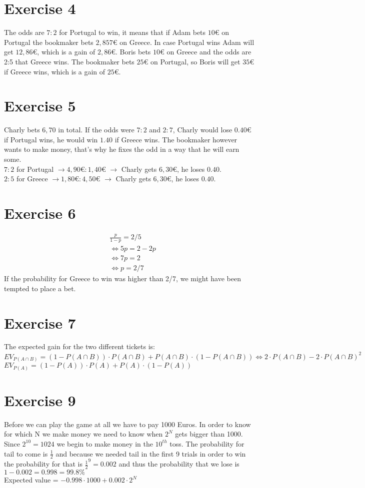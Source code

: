 \section*{Exercise 4}
The odds are $7 : 2$ for Portugal to win, it means that if Adam bets $10\euro$ on Portugal the bookmaker bets $2,857€$ on Greece. In case Portugal wins Adam will get $12,86€$, which is a gain of $2,86€$.
Boris bets $10€$ on Greece and the odds are 2:5 that Greece wins. The bookmaker bets $25€$ on Portugal, so Boris will get $35€$ if Greece wins, which is a gain of $25€$.

\section*{Exercise 5}
Charly bets $6,70$ in total.
If the odds were $7 : 2$ and $2 : 7$, Charly would lose $0.40€$ if Portugal wins, he would win $1.40$ if Greece wins. The bookmaker however wants to make money, that's why he fixes the odd in a way that he will earn some.\\
$7 : 2$ for Portugal $\rightarrow 4,90€ : 1,40€$ $\rightarrow$ Charly gets $6,30€$, he loses $0.40$.\\
$2 : 5$ for Greece $\rightarrow 1,80€ : 4,50€$ $\rightarrow$ Charly gets $6,30€$, he loses $0.40$.

\section*{Exercise 6}
\begin{align*}
& \frac{p}{1-p} = 2/5\\
& \Leftrightarrow 5p = 2 - 2p\\
& \Leftrightarrow 7p = 2\\
& \Leftrightarrow p = 2/7
\end{align*}
If the probability for Greece to win was higher than 2/7, we might have been tempted to place a bet.

\section*{Exercise 7}
The expected gain for the two different tickets is:\\
$EV_{P(A \cap B)} = (1 - P(A \cap B)) \cdot P(A \cap B) + P(A \cap B) \cdot (1 - P(A \cap B)) \Leftrightarrow 2 \cdot P(A \cap B) - 2 \cdot P(A \cap B)^2$ \\
$EV_{P(A)} = (1 - P(A)) \cdot P(A) + P(A) \cdot (1 - P(A))$

\section*{Exercise 9}
Before we can play the game at all we have to pay 1000 Euros. In order to know for which N we make money we need to know when $2^{N}$ gets bigger than 1000. Since $2^{10} = 1024$ we begin to make money in the $10^{th}$ toss.
The probability for tail to come is $\frac{1}{2}$ and because we needed tail in the first 9 trials in order to win the probability for that is $\frac{1}{2}^{9} = 0.002$ and thus the probability that we lose is $1-0.002 = 0.998 = 99.8\%$ \\
Expected value = $-0.998\cdot 1000 + 0.002\cdot 2^{N}$ 


